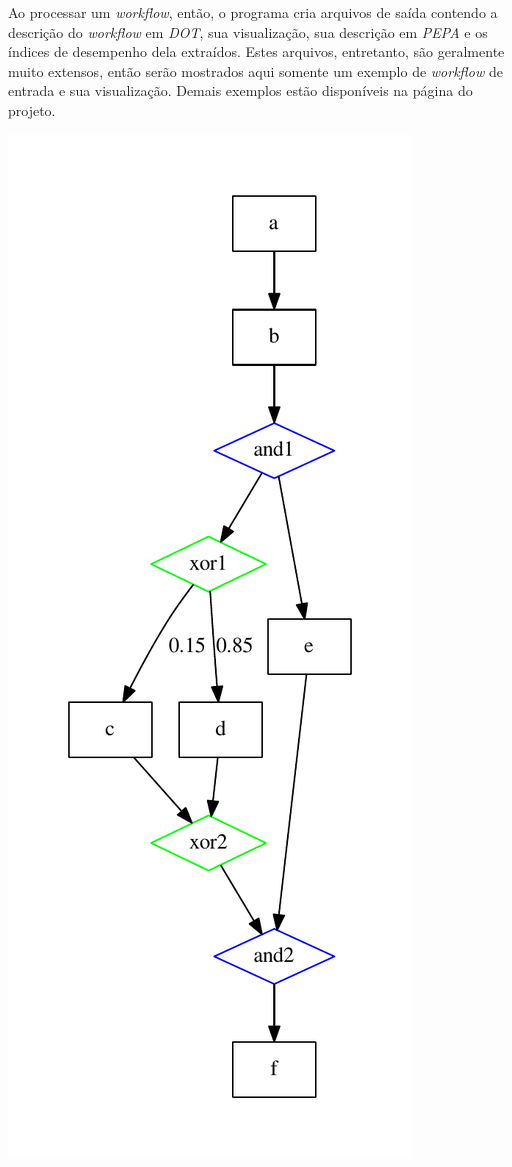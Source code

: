 \documentclass[a4paper,11pt]{article}
\begin{document}
        Ao processar um \emph{workflow}, então, o programa cria arquivos de saída contendo a descrição do \emph{workflow} em \emph{DOT}, sua visualização, sua descrição em \emph{PEPA} e os índices de desempenho dela extraídos. Estes arquivos, entretanto, são geralmente muito extensos, então serão mostrados aqui somente um exemplo de \emph{workflow} de entrada e sua visualização. Demais exemplos estão disponíveis na página do projeto.\\

        \begin{minipage}[c]{0.6\textwidth}
            \centering
            
        \end{minipage}%
        \begin{minipage}[r]{0.4\textwidth}
            \centering
            \includegraphics[width=0.65\linewidth]{example.pdf}
            \label{fig:pdf}
        \end{minipage}
    \newpage
\end{document}
